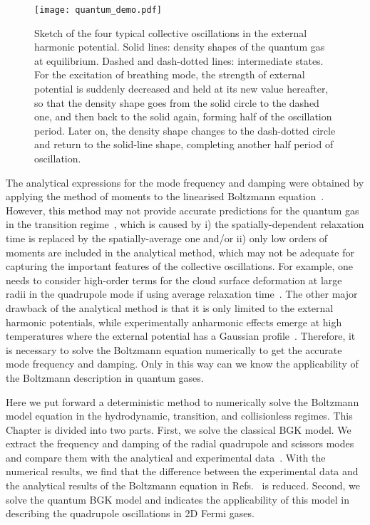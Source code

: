 \begin{figure}[t]
	\center
	\texttt{[image: quantum\_demo.pdf]}
	\caption{
		Sketch of the four typical collective oscillations in the external harmonic potential. Solid lines: density shapes of the quantum gas at equilibrium. Dashed and dash-dotted lines: intermediate states. For the excitation of breathing mode, the strength of external potential is suddenly decreased and held at its new value hereafter, so that the density shape goes from the solid circle to the dashed one, and then back to the solid again, forming half of the oscillation period. Later on, the density shape changes to the dash-dotted circle and return to the solid-line shape, completing another half period of oscillation.  
	}
	\label{quan_demo}
\end{figure}


The analytical expressions for the mode frequency and damping were obtained by applying the method of moments to the linearised Boltzmann equation~\cite{AlKhawaja2000,Guery-Odelin1999,Massignan2005,Bruun2007,Riedl2008}. However, this method may not provide accurate predictions for the quantum gas in the transition regime~\cite{Riedl2008,Lepers2010}, which is caused by i) the spatially-dependent relaxation time is replaced by the spatially-average one and/or ii) only low orders of moments are included in the analytical method, which may not be adequate for capturing the important features of the collective oscillations. For example, one needs to consider high-order terms for the cloud surface deformation at large radii in the quadrupole mode if using average relaxation time~\cite{Lepers2010}. The other major drawback of the analytical method is that it is only limited to the external harmonic potentials, while experimentally anharmonic effects emerge at high temperatures where the external potential has a Gaussian profile~\cite{Riedl2008,Wright2007}. Therefore, it is necessary to solve the Boltzmann equation numerically to get the accurate mode frequency and damping. Only in this way can we know the applicability of the Boltzmann description in quantum gases. 


Here we put forward a deterministic method to numerically solve the Boltzmann model equation in the hydrodynamic, transition, and collisionless regimes. This Chapter is divided into two parts. First, we solve the classical BGK model. We extract the frequency and damping of the radial quadrupole and scissors modes and compare them with the analytical and experimental data~\cite{Wright2007,AlKhawaja2000, Riedl2008,Bruun2007}. With the numerical results, we find that the difference between the experimental data and the analytical results of the Boltzmann equation in Refs.~\cite{Wright2007, Riedl2008} is reduced. Second, we solve the quantum BGK model and indicates the applicability of this model in describing the quadrupole oscillations in 2D Fermi gases.


